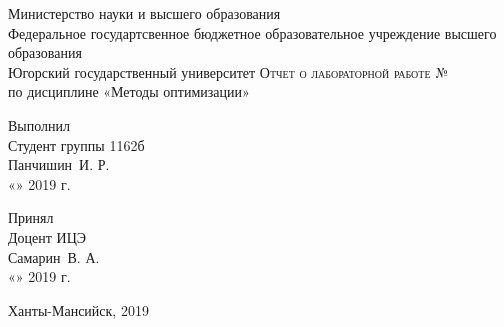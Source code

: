\begin{titlepage}
    \begin{center}
        Министерство науки и высшего образования\\
        Федеральное государтсвенное бюджетное образовательное учреждение высшего образования\\
        Югорский государственный университет
        \vfill
        \textsc{Отчет о лабораторной работе №\labn}\\
        по дисциплине «Методы оптимизации»
        \vfill
    \end{center}

    \vfill

    \newlength{\datelen}
    \hfill\begin{minipage}{0.4\textwidth}
        Выполнил\\

        Студент группы 1162б\\
        \underline{\hspace{\datelen}} Панчишин~И. Р.\\
        «\underline{\hspace{0.7cm}}» \underline{\hspace{2cm}} 2019 г.
    \end{minipage}

    \bigskip

    \hfill\begin{minipage}{0.4\textwidth}
        Принял\\

        Доцент ИЦЭ\\
        \underline{\hspace{\datelen}} Самарин~В. А.\\
        «\underline{\hspace{0.7cm}}» \underline{\hspace{2cm}} 2019 г.
    \end{minipage}

    \vfill

    \begin{center}
        Ханты-Мансийск, 2019
    \end{center}
\end{titlepage}
